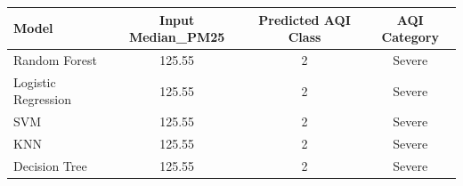 \begin{tabular}{lccc}
\toprule
Model & Input Median\_PM25 & Predicted AQI Class & AQI Category \\ \midrule
Random Forest & 125.55 & 2 & Severe \\
Logistic Regression & 125.55 & 2 & Severe \\
SVM & 125.55 & 2 & Severe \\
KNN & 125.55 & 2 & Severe \\
Decision Tree & 125.55 & 2 & Severe \\
\bottomrule
\end{tabular}
